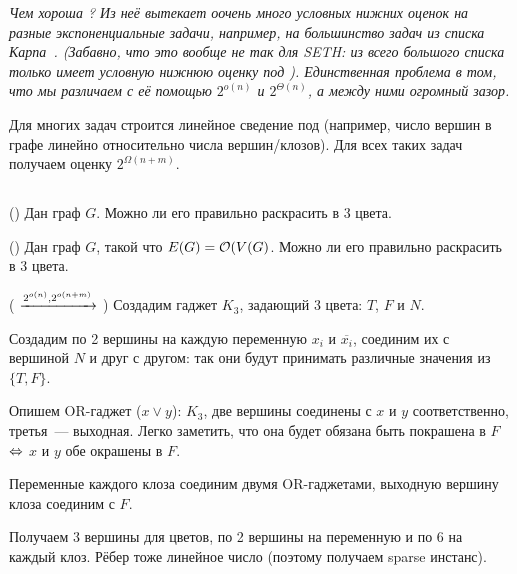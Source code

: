 
\textit{Чем хороша ? Из неё вытекает оочень много условных нижних оценок на разные экспоненциальные задачи, например, на большинство задач из списка Карпа~\cite{Karp1972}. (Забавно, что это вообще не так для SETH: из всего большого списка только  имеет условную нижнюю оценку под ). Единственная проблема  в том, что мы различаем с её помощью $2^{o(n)}$ и $2^{\Theta(n)}$, а между ними огромный зазор.}

\begin{remark}
    Для многих задач строится линейное сведение под  (например, число вершин в графе линейно относительно числа вершин/клозов). Для всех таких задач получаем оценку $2^{\Omega(n + m)}$.
\end{remark}

\subsection{}

\begin{problem}()
   Дан граф $G$. Можно ли его правильно раскрасить в 3 цвета.
\end{problem}

\begin{problem}()
   Дан граф $G$, такой что $E(G) = \mathcal{O}(V(G)$. Можно ли его правильно раскрасить в 3 цвета.
\end{problem}

\begin{reduction}( $\xrightarrow{2^{o(n)}, 2^{o(n + m)}}$ )
    Создадим гаджет $K_3$, задающий 3 цвета: $T$, $F$ и $N$.

    Создадим по 2 вершины на каждую переменную $x_i$ и $\overline{x_i}$, соединим их с вершиной $N$ и друг с другом: так они будут принимать различные значения из $\{ T, F \}$.

    Опишем OR-гаджет ($x \vee y$): $K_3$, две вершины соединены с $x$ и $y$ соответственно, третья~--- выходная. Легко заметить, что она будет обязана быть покрашена в $F$ $\Leftrightarrow$ $x$ и $y$ обе окрашены в $F$.

    Переменные каждого клоза соединим двумя OR-гаджетами, выходную вершину клоза соединим с $F$.

    Получаем 3 вершины для цветов, по 2 вершины на переменную и по 6 на каждый клоз. Рёбер тоже линейное число (поэтому получаем sparse инстанс).
\end{reduction}

